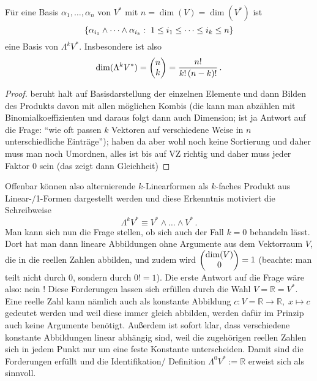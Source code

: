 \documentclass[../H_Analysis_main.tex]{subfiles}
\begin{document}
\begin{satz}
Für eine Basis $\alpha_1, \dots, \alpha_n$ von $V^*$ mit $n = \dim(V) = \dim(V^*)$ ist
\begin{equation}
\qty{\alpha_{i_1} \wedge \dots \wedge \alpha_{i_k}: \; 1 \leq i_1 \leq \dots \leq i_k \leq n}
\end{equation}
eine Basis von $\Lambda^k V^*$. Insbesondere ist also
\begin{equation}
\dim(\Lambda^k V^*) = \mqty(n \\ k) = \frac{n!}{k! \, (n - k)!} \, .
\end{equation}
\end{satz}
\begin{proof}
beruht halt auf Basisdarstellung der einzelnen Elemente und dann Bilden des Produkts davon mit allen möglichen Kombis (die kann man abzählen mit Binomialkoeffizienten und daraus folgt dann auch Dimension; ist ja Antwort auf die Frage: \enquote{wie oft passen $k$ Vektoren auf verschiedene Weise in $n$ unterschiedliche Einträge}); haben da aber wohl noch keine Sortierung und daher muss man noch Umordnen, alles ist bis auf VZ richtig und daher muss jeder Faktor 0 sein (das zeigt dann Gleichheit)
\end{proof}

Offenbar können also alternierende $k$-Linearformen als $k$-faches Produkt aus Linear-/1-Formen dargestellt werden und diese Erkenntnis motiviert die Schreibweise
\begin{equation}
\Lambda^k V^* \equiv V^* \wedge \dots \wedge V^* \, .
\end{equation}
Man kann sich nun die Frage stellen, ob sich auch der Fall $k = 0$ behandeln lässt. Dort hat man dann lineare Abbildungen ohne Argumente aus dem Vektorraum $V$, die in die reellen Zahlen abbilden, und zudem wird $\mqty(\dim(V) \\ 0) = 1$ (beachte: man teilt nicht durch 0, sondern durch $0! = 1$). Die erste Antwort auf die Frage wäre also: nein ! Diese Forderungen lassen sich erfüllen durch die Wahl $V = \mathbb{R} = V^*$. Eine reelle Zahl kann nämlich auch als konstante Abbildung $c: V = \mathbb{R} \rightarrow \mathbb{R}, \; x \mapsto c$ gedeutet werden und weil diese immer gleich abbilden, werden dafür im Prinzip auch keine Argumente benötigt. Außerdem ist sofort klar, dass verschiedene konstante Abbildungen linear abhängig sind, weil die zugehörigen reellen Zahlen sich in jedem Punkt nur um eine feste Konstante unterscheiden. Damit sind die Forderungen erfüllt und die Identifikation/ Definition $\Lambda^0 V^* := \mathbb{R}$ erweist sich als sinnvoll.
\end{document}
